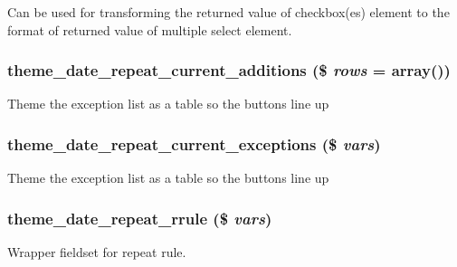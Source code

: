 Can be used for transforming the returned value of checkbox(es) element to the format of returned value of multiple select element. \hypertarget{date__repeat__form_8inc_ac506967b460505306823f02dc8a134ab}{
\subsubsection[{theme\_\-date\_\-repeat\_\-current\_\-additions}]{\setlength{\rightskip}{0pt plus 5cm}theme\_\-date\_\-repeat\_\-current\_\-additions (\$ {\em rows} = {\ttfamily array()})}}
\label{date__repeat__form_8inc_ac506967b460505306823f02dc8a134ab}
Theme the exception list as a table so the buttons line up \hypertarget{date__repeat__form_8inc_a2dbdfbf5bd0d003c35b94e86da37093c}{
\subsubsection[{theme\_\-date\_\-repeat\_\-current\_\-exceptions}]{\setlength{\rightskip}{0pt plus 5cm}theme\_\-date\_\-repeat\_\-current\_\-exceptions (\$ {\em vars})}}
\label{date__repeat__form_8inc_a2dbdfbf5bd0d003c35b94e86da37093c}
Theme the exception list as a table so the buttons line up \hypertarget{date__repeat__form_8inc_a3f1fc7954d4c804a9cd8889e5b97bf5b}{
\subsubsection[{theme\_\-date\_\-repeat\_\-rrule}]{\setlength{\rightskip}{0pt plus 5cm}theme\_\-date\_\-repeat\_\-rrule (\$ {\em vars})}}
\label{date__repeat__form_8inc_a3f1fc7954d4c804a9cd8889e5b97bf5b}
Wrapper fieldset for repeat rule. 